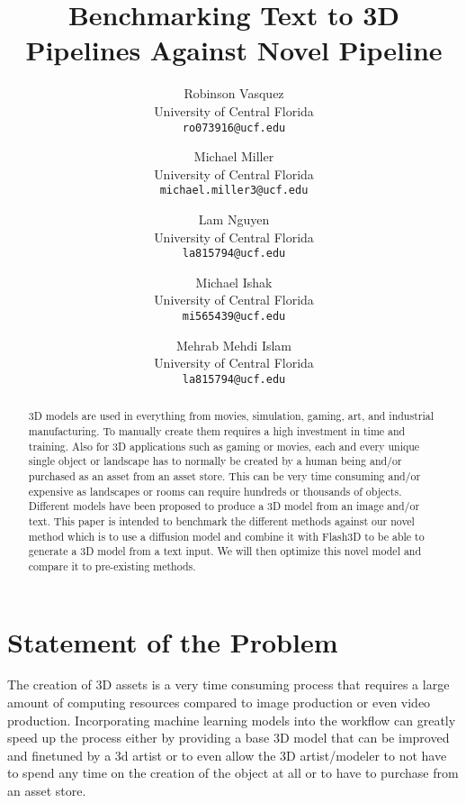 \documentclass[10pt,twocolumn,letterpaper]{article}
\begin{document}
\raggedbottom  %

\title{Benchmarking Text to 3D Pipelines Against Novel Pipeline}

\author{
Robinson Vasquez\\
University of Central Florida\\
{\tt\small ro073916@ucf.edu}
\and
Michael Miller\\
University of Central Florida\\
{\tt\small michael.miller3@ucf.edu}
\and
Lam Nguyen\\
University of Central Florida\\
{\tt\small la815794@ucf.edu}
\and
Michael Ishak\\
University of Central Florida\\
{\tt\small mi565439@ucf.edu}
\and
Mehrab Mehdi Islam\\
University of Central Florida\\
{\tt\small la815794@ucf.edu}
}
\maketitle

\begin{abstract}

3D models are used in everything from movies, simulation, gaming, art, and industrial manufacturing. To manually create them requires a high investment in time and training. Also for 3D applications such as gaming or movies, each and every unique single object or landscape has to normally be created by a human being and/or purchased as an asset from an asset store. This can be very time consuming and/or expensive as landscapes or rooms can require hundreds or thousands of objects. Different models have been proposed to produce a 3D model from an image and/or text. This paper is intended to benchmark the different methods against our novel method  which is to use a diffusion model and combine it with Flash3D to be able to generate a 3D model from a text input.  We will then optimize this novel model and compare it to pre-existing methods.

\end{abstract}

\section{Statement of the Problem}

The creation of 3D assets is a very time consuming process that requires a large amount of computing resources compared to image production or even video production. Incorporating machine learning models into the workflow can greatly speed up the process either by providing a base 3D model that can be improved and finetuned by a 3d artist or to even allow the 3D artist/modeler to not have to spend any time on the creation of the object at all or to have to purchase from an asset store.
\end{document}
